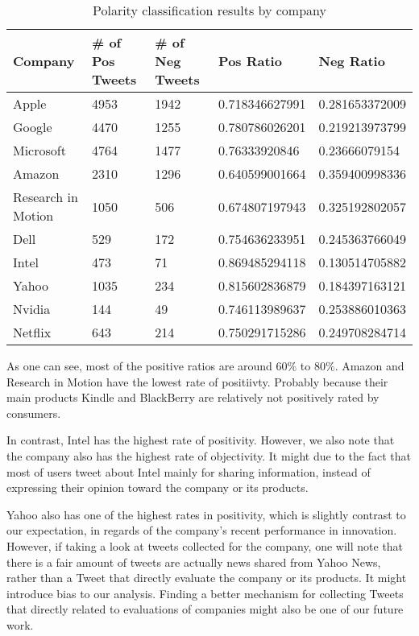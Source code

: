 \documentclass[12pt]{article}
\begin{document}
\begin{table}
\begin{center}
    \begin{tabular}{ | l || l | l | l | l | }
        \hline
        Company &  \# of Pos Tweets & \# of Neg Tweets & Pos Ratio & Neg Ratio \\ \hline
        Apple &  4953 & 1942 & 0.718346627991 & 0.281653372009 \\ \hline
        Google &  4470 & 1255 & 0.780786026201 & 0.219213973799 \\ \hline
        Microsoft &  4764 & 1477 & 0.76333920846 & 0.23666079154 \\ \hline
        Amazon &  2310 & 1296 & 0.640599001664 & 0.359400998336 \\ \hline
        Research in Motion &  1050 & 506 & 0.674807197943 & 0.325192802057 \\ \hline
        Dell &  529 & 172 & 0.754636233951 & 0.245363766049 \\ \hline
        Intel &  473 & 71 & 0.869485294118 & 0.130514705882 \\ \hline
        Yahoo &  1035 & 234 & 0.815602836879 & 0.184397163121 \\ \hline
        Nvidia &  144 & 49 & 0.746113989637 & 0.253886010363 \\ \hline
        Netflix &  643 & 214 & 0.750291715286 & 0.249708284714 \\ \hline
    \end{tabular}
\caption{Polarity classification results by company}
\label{polarity-by-company}
\end{center}
\end{table}

As one can see, most of the positive ratios are around $60\%$ to $80\%$. Amazon and Research in Motion have the lowest rate of positiivty. Probably because their main products Kindle and BlackBerry are relatively not positively rated by consumers. 

In contrast, Intel has the highest rate of positivity. However, we also note that the company also has the highest rate of objectivity. It might due to the fact that most of users tweet about Intel mainly for sharing information, instead of expressing their opinion toward the company or its products.

Yahoo also has one of the highest rates in positivity, which is slightly contrast to our expectation, in regards of the company's recent performance in innovation. However, if taking a look at tweets collected for the company, one will note that there is a fair amount of tweets are actually news shared from Yahoo News, rather than a Tweet that directly evaluate the company or its products. It might introduce bias to our analysis. Finding a better mechanism for collecting Tweets that directly related to evaluations of companies might also be one of our future work.
\end{document}
